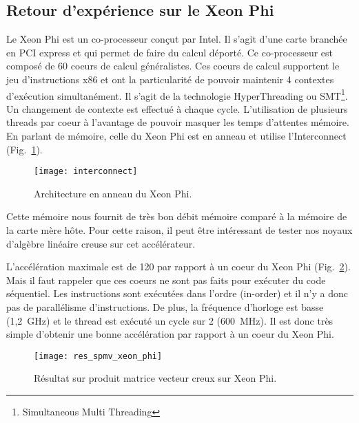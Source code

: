 \newpage
\subsection{Retour d'expérience sur le Xeon Phi}
Le Xeon Phi est un co-processeur conçut par Intel.
%
Il s'agit d'une carte branchée en PCI express et qui permet de faire du calcul déporté.
%
Ce co-processeur est composé de 60 coeurs de calcul généralistes.
%
Ces coeurs de calcul supportent le jeu d'instructions x86 et ont la particularité de pouvoir maintenir 4 contextes d'exécution simultanément.
%
Il s'agit de la technologie HyperThreading ou SMT\footnote{Simultaneous Multi Threading}.
%
Un changement de contexte est effectué à chaque cycle.
%
L'utilisation de plusieurs threads par coeur à l'avantage de pouvoir masquer les temps d'attentes mémoire.
%
En parlant de mémoire, celle du Xeon Phi est en anneau et utilise l'Interconnect (Fig.~\ref{fig:interconnect}).

\begin{figure}[t!]
  \centering
  \texttt{[image: interconnect]}
  \caption{Architecture en anneau du Xeon Phi.}
  \label{fig:interconnect}
\end{figure}


Cette mémoire nous fournit de très bon débit mémoire comparé à la mémoire de la carte mère hôte.
%
Pour cette raison, il peut être intéressant de tester nos noyaux d'algèbre linéaire creuse sur cet accélérateur.



L'accélération maximale est de 120 par rapport à un coeur du Xeon Phi (Fig.~\ref{fig:res_spmv_xeon_phi}).
%
Mais il faut rappeler que ces coeurs ne sont pas faits pour exécuter du code séquentiel.
%
Les instructions sont exécutées dans l'ordre (in-order) et il n'y a donc pas de parallélisme d'instructions.
%
De plus, la fréquence d'horloge est basse (1,2~GHz) et le thread est exécuté un cycle sur 2 (600~MHz).
%
Il est donc très simple d'obtenir une bonne accélération par rapport à un coeur du Xeon Phi.

\begin{figure}[t!]
  \centering
  \texttt{[image: res\_spmv\_xeon\_phi]}
  \caption{Résultat sur produit matrice vecteur creux sur Xeon Phi.}
  \label{fig:res_spmv_xeon_phi}
\end{figure}



